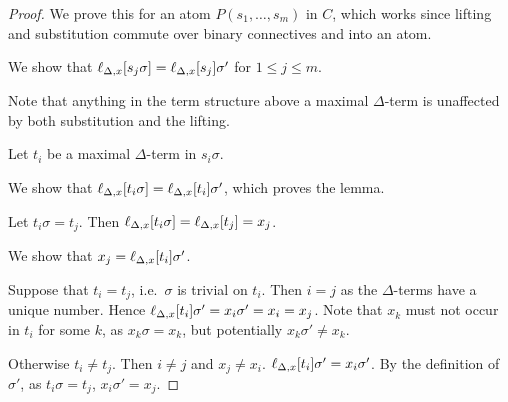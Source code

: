 \documentclass[,%
	paper=a4,%
	DIV14, 
	liststotoc,
	bibtotoc,
	draft=false,%
	numbers=noendperiod
]{scrartcl}
\newcommand{\lif}[1]{\lift{\Delta}{#1}{x}}
\begin{document}
\begin{proof}
	We prove this for an atom $P(s_1, \ldots, s_m)$ in $C$, which works since lifting and substitution commute over binary connectives and into an atom.

	We show that 
	$\lif{s_j \sigma} = \lif{s_j}\sigma'$ for $1 \leq j \leq m$.


	Note that anything in the term structure above a maximal $\Delta$-term is unaffected by both substitution and the lifting.

	Let $t_i$ be a maximal $\Delta$-term in $s_i \sigma$.

	We show that $ \lif{ t_i \sigma } = \lif{ t_i } \sigma'$, which proves the lemma.

	Let $t_i\sigma = t_j$. Then $\lif{ t_i\sigma} = \lif{t_j} = x_j$.

	We show that $x_j = \lif{t_i}\sigma'$.

	Suppose that $t_i = t_j$, i.e.\ $\sigma$ is trivial on $t_i$.
	Then $i=j$ as the $\Delta$-terms have a unique number.
	Hence $\lif{t_i}\sigma' = x_i \sigma' = x_i = x_j$.
	Note that $x_k$ must not occur in $t_i$ for some $k$, as $x_k\sigma = x_k$, but potentially $x_k\sigma' \neq x_k$.


	Otherwise $t_i \neq t_j$. Then $i\neq j$ and  $x_j \neq x_i$.\newline
	$\lif{t_i}\sigma' = x_i \sigma'$.
	By the definition of $\sigma'$, as $t_i\sigma = t_j$, $x_i\sigma' = x_j$.
	\begin{comment}
		Suppose no $\Delta$-colored symbol occurs in $s_j$ or $s_j\sigma$. Then $\lif{s_j\sigma} = s_j\sigma $. this equals $  s_j\sigma'$ as there, only the second case applies, where the lifting doesn't affect the term.

		Suppose a maximal $\Delta$-colored term $t_i$ occurs in $s_j\sigma$ but not in $s_j$ and suppose it's the only one in $s_j\sigma$.
		Then $\lif{ s_j\sigma } = \lif{ s_j\sigma^{t_i} }= s_j\sigma^{t_i} \abstraction{t_i/x_i} = \lif{s_j} \sigma^{t_i} \abstraction{t_i/x_i}$
	\end{comment}
\end{proof}
\end{document}
